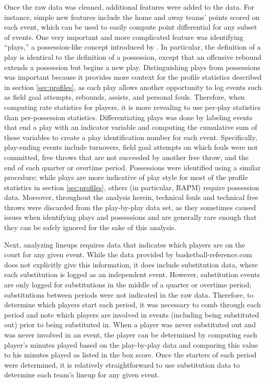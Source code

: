 Once the raw data was cleaned, additional features were added to the data. For
instance, simple new features include the home and away teams' points scored on each
event, which can be used to easily compute point differential for any subset of
events. One very important and more complicated feature was identifying ``plays,'' a
possession-like concept introduced by \citeauthor{Maymin}. In particular, the
definition of a play is identical to the definition of a possession, except that an
offensive rebound extends a possession but begins a new play. Distinguishing plays
from possessions was important because it provides more context for the profile
statistics described in section \ref{sec:profiles}, as each play allows another
opportunity to log events such as field goal attempts, rebounds, assists, and
personal fouls. Therefore, when computing rate statistics for players, it is more
revealing to use per-play statistics than per-possession statistics.
Differentiating plays was done by labeling events that end a play with an indicator
variable and computing the cumulative sum of these variables to create a play
identification number for each event. Specifically, play-ending events include
turnovers, field goal attempts on which fouls were not committed, free throws that
are not succeeded by another free throw, and the end of each quarter or overtime
period. Possessions were identified using a similar procedure; while plays are more
indicative of play style for most of the profile statistics in section
\ref{sec:profiles}, others (in particular, RAPM) require possession data. Moreover,
throughout the analysis herein, technical fouls and technical free throws were
discarded from the play-by-play data set, as they sometimes caused issues when
identifying plays and possessions and are generally rare enough that they can be
safely ignored for the sake of this analysis.

Next, analyzing lineups requires data that indicates which players are on the court
for any given event. While the data provided by basketball-reference.com does not
explicitly give this information, it does include substitution data, where each
substitution is logged as an independent event. However, substitution events are
only logged for substitutions in the middle of a quarter or overtime period;
substitutions between periods were not indicated in the raw data. Therefore, to
determine which players start each period, it was necessary to comb through each
period and note which players are involved in events (including being substituted
out) prior to being substituted in. When a player was never substituted out and was
never involved in an event, the player can be determined by computing each player's
minutes played based on the play-by-play data and comparing this value to his
minutes played as listed in the box score. Once the starters of each period were
determined, it is relatively straightforward to use substitution data to determine
each team's lineup for any given event.

